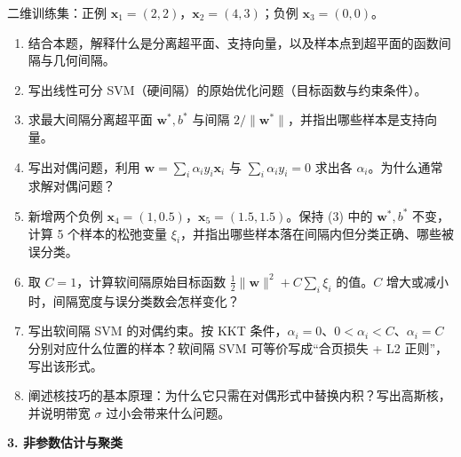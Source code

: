 二维训练集：正例 $\bm x_1=(2,2)$，$\bm x_2=(4,3)$；负例 $\bm x_3=(0,0)$。
\begin{enumerate}[label=(\arabic*)]
\item 结合本题，解释什么是分离超平面、支持向量，以及样本点到超平面的函数间隔与几何间隔。
\item 写出线性可分 SVM（硬间隔）的原始优化问题（目标函数与约束条件）。
\item 求最大间隔分离超平面 $\bm w^{*},b^{*}$ 与间隔 $2/\|\bm w^*\|$，并指出哪些样本是支持向量。
\item 写出对偶问题，利用 $\bm w=\sum_i\alpha_iy_i\bm x_i$ 与 $\sum_i\alpha_iy_i=0$ 求出各 $\alpha_i$。为什么通常求解对偶问题？
\item 新增两个负例 $\bm x_4=(1,0.5)$，$\bm x_5=(1.5,1.5)$。保持 (3) 中的 $\bm w^{*},b^{*}$ 不变，计算 5 个样本的松弛变量 $\xi_i$，并指出哪些样本落在间隔内但分类正确、哪些被误分类。
\item 取 $C=1$，计算软间隔原始目标函数 $\frac12\|\bm w\|^2+C\sum_i\xi_i$ 的值。$C$ 增大或减小时，间隔宽度与误分类数会怎样变化？
\item 写出软间隔 SVM 的对偶约束。按 KKT 条件，$\alpha_i=0$、$0<\alpha_i<C$、$\alpha_i=C$ 分别对应什么位置的样本？软间隔 SVM 可等价写成“合页损失 + L2 正则”，写出该形式。
\item 阐述核技巧的基本原理：为什么它只需在对偶形式中替换内积？写出高斯核，并说明带宽 $\sigma$ 过小会带来什么问题。
\end{enumerate}

\bigskip
\noindent\textbf{3. 非参数估计与聚类}

